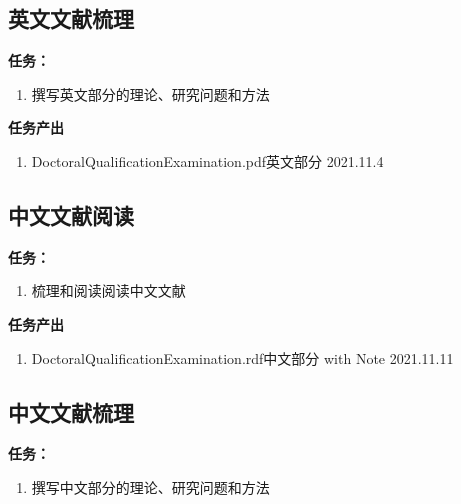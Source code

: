 \documentclass[
  12pt,
]{ctexart}
\providecommand{\tightlist}{%
  \setlength{\itemsep}{0pt}\setlength{\parskip}{0pt}}
\begin{document}
\hypertarget{ux82f1ux6587ux6587ux732eux68b3ux7406}{%
\subsection{英文文献梳理}\label{ux82f1ux6587ux6587ux732eux68b3ux7406}}

\textbf{任务：}

\begin{enumerate}
\def\labelenumi{\arabic{enumi}.}
\tightlist
\item
  撰写英文部分的理论、研究问题和方法
\end{enumerate}

\textbf{任务产出}

\begin{enumerate}
\def\labelenumi{\arabic{enumi}.}
\tightlist
\item
  DoctoralQualificationExamination.pdf英文部分 \hfill 2021.11.4
\end{enumerate}

\hypertarget{ux4e2dux6587ux6587ux732eux9605ux8bfb}{%
\subsection{中文文献阅读}\label{ux4e2dux6587ux6587ux732eux9605ux8bfb}}

\textbf{任务：}

\begin{enumerate}
\def\labelenumi{\arabic{enumi}.}
\tightlist
\item
  梳理和阅读阅读中文文献
\end{enumerate}

\textbf{任务产出}

\begin{enumerate}
\def\labelenumi{\arabic{enumi}.}
\tightlist
\item
  DoctoralQualificationExamination.rdf中文部分 with Note \hfill 2021.11.11
\end{enumerate}

\hypertarget{ux4e2dux6587ux6587ux732eux68b3ux7406}{%
\subsection{中文文献梳理}\label{ux4e2dux6587ux6587ux732eux68b3ux7406}}

\textbf{任务：}

\begin{enumerate}
\def\labelenumi{\arabic{enumi}.}
\tightlist
\item
  撰写中文部分的理论、研究问题和方法
\end{enumerate}
\end{document}
